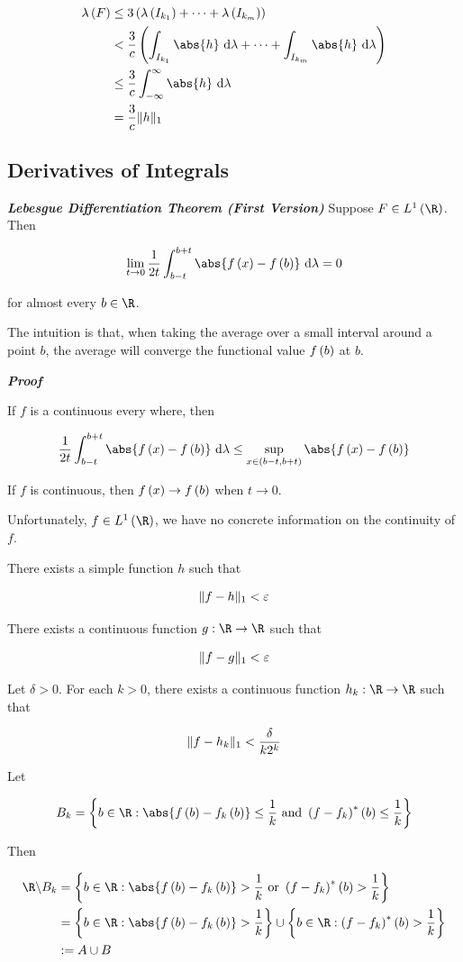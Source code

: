 \documentclass[
]{article}
\begin{document}
\[\ba
\lambda\pr{F} & \le 3\pr{\lambda\pr{I_{k_1}}+\cdots+\lambda\pr{I_{k_m}}}\\
& < \frac3c \pr{\int_{I_{k_1}}\abs{h}\d\lambda+\cdots+\int_{I_{k_m}}\abs{h}\d\lambda}\\
& \le\frac3c \int_{-\infty}^{\infty}\abs{h}\d\lambda \\
& = \frac3c \norm{h}
\ea\]

\hypertarget{derivatives-of-integrals}{%
\subsection{Derivatives of Integrals}\label{derivatives-of-integrals}}

\emph{\textbf{Lebesgue Differentiation Theorem (First Version)}} Suppose
\(F\in L^1\pr{\R}\). Then

\[\lim_{t\to 0}\frac1{2t}\int_{b-t}^{b+t}\abs{f\pr{x}-f\pr{b}}\dl = 0\]

for almost every \(b\in \R\).

The intuition is that, when taking the average over a small interval
around a point \(b\), the average will converge the functional value
\(f\left(b\right)\) at \(b\).

\emph{\textbf{Proof}}

If \(f\) is a continuous every where, then

\[\frac1{2t}\int_{b-t}^{b+t}\abs{f\pr{x}-f\pr{b}}\dl\le \sup_{x\in\pr{b-t,b+t}}\abs{f\pr{x}-f\pr{b}}\]

If \(f\) is continuous, then \(f\left(x\right)\to f\left(b\right)\) when \(t\to 0\).

Unfortunately, \(f\in L^1\pr{\R}\), we have no concrete information on
the continuity of \(f\).

There exists a simple function \(h\) such that

\[\|{f-h}\|_{1}<\varepsilon\]

There exists a continuous function \(g:\R\to \R\) such that

\[\|{f-g}\|_{1}<\varepsilon\]

Let \(\delta>0\). For each \(k>0\), there exists a continuous function
\(h_k:\R\to \R\) such that

\[\|{f-h_k}\|_{1}<\frac{\delta}{k2^k}\]

Let

\[B_k = \brace{b\in\R:\abs{f\pr{b}-f_k\pr{b}}\le\frac1k\text{ and }\pr{f-f_k}^*\pr{b}\le\frac1k}\]

Then

\[\ba
\R\c B_k & = \brace{b\in\R: \abs{f\pr{b}-f_k\pr{b}}>\frac1k\text{ or }\pr{f-f_k}^*\pr{b}>\frac1k}\\
& = \brace{b\in\R: \abs{f\pr{b}-f_k\pr{b}}>\frac1k}\cup \brace{b\in\R:\pr{f-f_k}^*\pr{b}>\frac1k}\\
& := A\cup B
\ea\]
\end{document}
